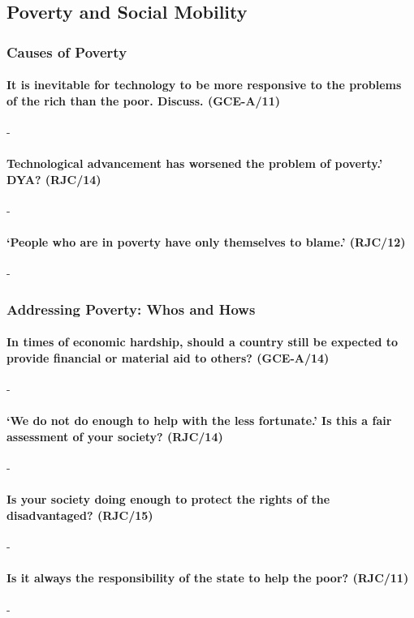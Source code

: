 \documentclass[../../main]{subfiles}
\begin{document}
\subsection{Poverty and Social Mobility}

\subsubsection{Causes of Poverty}

\paragraph{It is inevitable for technology to be more responsive to the problems of the rich than the poor. Discuss. (GCE-A/11)}-

\paragraph{Technological advancement has worsened the problem of poverty.' DYA? (RJC/14)}-

\paragraph{`People who are in poverty have only themselves to blame.' (RJC/12)}-

\subsubsection{Addressing Poverty: Whos and Hows}

\paragraph{In times of economic hardship, should a country still be expected to provide financial or material aid to others? (GCE-A/14)}-

\paragraph{`We do not do enough to help with the less fortunate.' Is this a fair assessment of your society? (RJC/14)}-

\paragraph{Is your society doing enough to protect the rights of the disadvantaged? (RJC/15)}-

\paragraph{Is it always the responsibility of the state to help the poor? (RJC/11)}-
\end{document}
